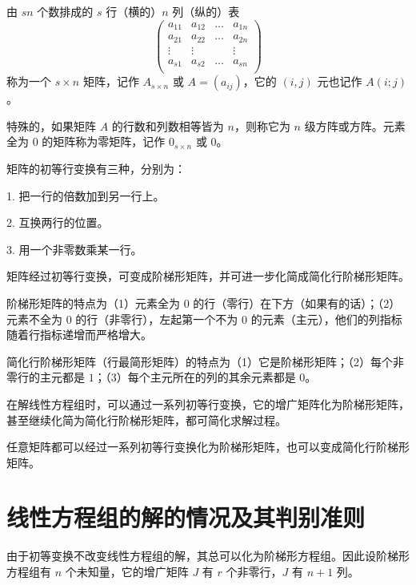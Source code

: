 \begin{definition}
	由 $sn$ 个数排成的 $s$ 行（横的）$n$ 列（纵的）表
	\begin{equation*}
		\left(
			\begin{matrix}
				a_{11}&a_{12}&\ldots&a_{1n}\\
				a_{21}&a_{22}&\ldots&a_{2n}\\
				\vdots&\vdots&&\vdots\\a_{s1}&a_{s2}&\ldots&a_{sn}\\
			\end{matrix}
		\right)
	\end{equation*}
	称为一个 $s\times n$ 矩阵，记作 $A_{s\times n}$ 或 $A=(a_{ij})$，它的 $(i,j)$ 元也记作 $A(i;j)$。
\end{definition}

特殊的，如果矩阵 $A$ 的行数和列数相等皆为 $n$，则称它为 $n$ 级方阵或方阵。元素全为 $0$ 的矩阵称为零矩阵，记作 $0_{s\times n}$ 或 $0$。

\begin{definition}[初等行变换]
	矩阵的初等行变换有三种，分别为：
	
	1. 把一行的倍数加到另一行上。

	2. 互换两行的位置。

	3. 用一个非零数乘某一行。
\end{definition}

矩阵经过初等行变换，可变成阶梯形矩阵，并可进一步化简成简化行阶梯形矩阵。

阶梯形矩阵的特点为（1）元素全为 $0$ 的行（零行）在下方（如果有的话）；（2）元素不全为 $0$ 的行（非零行），左起第一个不为 $0$ 的元素（主元），他们的列指标随着行指标递增而严格增大。

简化行阶梯形矩阵（行最简形矩阵）的特点为（1）它是阶梯形矩阵；（2）每个非零行的主元都是 $1$；（3）每个主元所在的列的其余元素都是 $0$。

在解线性方程组时，可以通过一系列初等行变换，它的增广矩阵化为阶梯形矩阵，甚至继续化简为简化行阶梯形矩阵，都可简化求解过程。

\begin{theorem}
	任意矩阵都可以经过一系列初等行变换化为阶梯形矩阵，也可以变成简化行阶梯形矩阵。
\end{theorem}

\section{线性方程组的解的情况及其判别准则}


由于初等变换不改变线性方程组的解，其总可以化为阶梯形方程组。因此设阶梯形方程组有 $n$ 个未知量，它的增广矩阵 $J$ 有 $r$ 个非零行，$J$ 有 $n+1$ 列。

